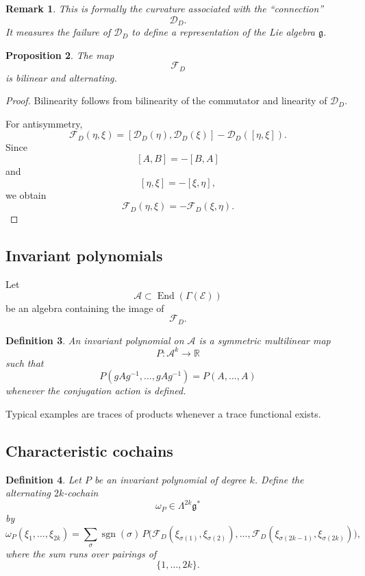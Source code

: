 \documentclass[11pt]{amsart}
\newtheorem{definition}{Definition}[section]
\newtheorem{proposition}[definition]{Proposition}
\newtheorem{remark}[definition]{Remark}
\begin{document}
\begin{remark}
This is formally the curvature associated with the ``connection''
\[
\mathcal D_D.
\]
It measures the failure of \(\mathcal D_D\) to define a representation of the
Lie algebra \(\mathfrak g\).
\end{remark}

\begin{proposition}
The map
\[
\mathcal F_D
\]
is bilinear and alternating.
\end{proposition}

\begin{proof}
Bilinearity follows from bilinearity of the commutator and linearity of
\(\mathcal D_D\).

For antisymmetry,
\[
\mathcal F_D(\eta,\xi)
=
[\mathcal D_D(\eta),\mathcal D_D(\xi)]
-
\mathcal D_D([\eta,\xi]).
\]
Since
\[
[A,B]=-[B,A]
\]
and
\[
[\eta,\xi]=-[\xi,\eta],
\]
we obtain
\[
\mathcal F_D(\eta,\xi)
=
-\mathcal F_D(\xi,\eta).
\]
\end{proof}

\subsection{Invariant polynomials}

Let
\[
\mathcal A
\subset
\operatorname{End}(\Gamma(\mathcal E))
\]
be an algebra containing the image of
\[
\mathcal F_D.
\]

\begin{definition}
An \emph{invariant polynomial} on \(\mathcal A\) is a symmetric multilinear map
\[
P:\mathcal A^k\to\mathbb R
\]
such that
\[
P(gAg^{-1},\ldots,gAg^{-1})
=
P(A,\ldots,A)
\]
whenever the conjugation action is defined.
\end{definition}

Typical examples are traces of products whenever a trace functional exists.

\subsection{Characteristic cochains}

\begin{definition}
Let \(P\) be an invariant polynomial of degree \(k\). Define the alternating
\(2k\)-cochain
\[
\omega_P
\in
\Lambda^{2k}\mathfrak g^*
\]
by
\[
\omega_P(\xi_1,\ldots,\xi_{2k})
=
\sum_{\sigma}
\operatorname{sgn}(\sigma)\,
P\bigl(
\mathcal F_D(\xi_{\sigma(1)},\xi_{\sigma(2)}),
\ldots,
\mathcal F_D(\xi_{\sigma(2k-1)},\xi_{\sigma(2k)})
\bigr),
\]
where the sum runs over pairings of
\[
\{1,\ldots,2k\}.
\]
\end{definition}
\end{document}
